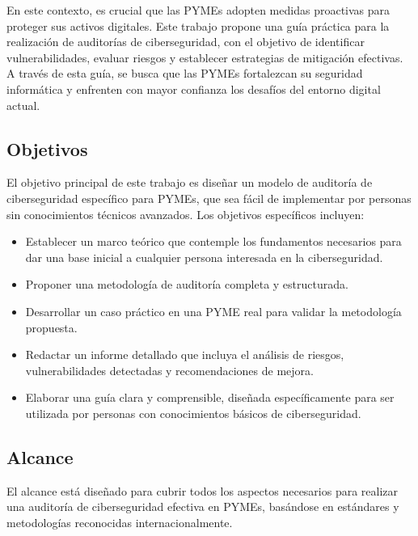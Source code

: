 \documentclass[a4paper, 10pt]{article}
\begin{document}
En este contexto, es crucial que las PYMEs adopten medidas proactivas para proteger sus activos digitales. Este trabajo propone una guía práctica para la realización de auditorías de ciberseguridad, con el objetivo de identificar vulnerabilidades, evaluar riesgos y establecer 
estrategias de mitigación efectivas. A través de esta guía, se busca que las PYMEs fortalezcan su seguridad informática y enfrenten con mayor confianza los desafíos del entorno digital actual.

\clearpage



\subsection{Objetivos}

El objetivo principal de este trabajo es dise\~nar un modelo de auditor\'ia de ciberseguridad  espec\'ifico para PYMEs, que sea f\'acil de implementar por personas sin conocimientos t\'ecnicos avanzados. Los objetivos espec\'ificos incluyen:

\begin{itemize}
    \item Establecer un marco te\'orico que contemple los fundamentos necesarios para dar una base inicial a cualquier persona interesada en la ciberseguridad.
    \item Proponer una metodolog\'ia de auditor\'ia completa y estructurada.
    \item Desarrollar un caso pr\'actico en una PYME real para validar la metodolog\'ia propuesta.
    \item Redactar un informe detallado que incluya el an\'alisis de riesgos, vulnerabilidades detectadas y recomendaciones de mejora.
    \item Elaborar una guía clara y comprensible, diseñada específicamente para ser utilizada por personas con conocimientos básicos de ciberseguridad.
\end{itemize}

\subsection{Alcance}

El alcance está diseñado para cubrir todos los aspectos necesarios para realizar una auditoría de ciberseguridad efectiva en PYMEs, basándose en estándares y metodologías reconocidas internacionalmente.
\end{document}
